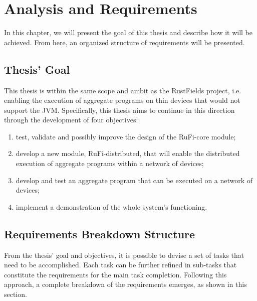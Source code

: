 
\chapter{Analysis and Requirements}
\label{chap:requirements}
In this chapter, we will present the goal of this thesis and describe how it will be achieved. From here, an organized structure of requirements will be presented.

\section{Thesis' Goal}
\label{sec:goal}
This thesis is within the same scope and ambit as the RustFields project, i.e. enabling the execution of aggregate programs on thin devices that would not support the JVM.
Specifically, this thesis aims to continue in this direction through the development of four objectives:

\begin{enumerate}
    \item \label{obj:1} test, validate and possibly improve the design of the RuFi-core module;
    \item \label{obj:2} develop a new module, RuFi-distributed, that will enable the distributed execution of aggregate programs within a network of devices;
    \item \label{obj:3} develop and test an aggregate program that can be executed on a network of devices;
    \item \label{obj:4} implement a demonstration of the whole system's functioning.
\end{enumerate}

\section{Requirements Breakdown Structure}
\label{sec:rbs}
From the thesis' goal and objectives, it is possible to devise a set of tasks that need to be accomplished. Each task can be further refined in sub-tasks that constitute the requirements for the main task completion.
Following this approach, a complete breakdown of the requirements emerges, as shown in this section.

